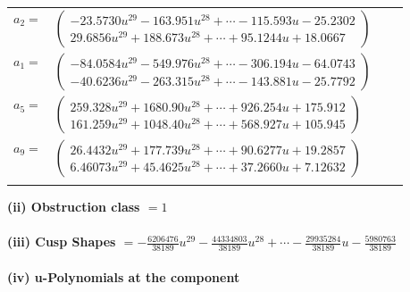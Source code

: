 \documentclass[1p]{elsarticle_modified}
\theoremstyle{definition}
\begin{document}
\begin{tabular}{m{7pt} m{180pt} m{7pt} m{180pt} }
\flushright $a_{2}=$&$\begin{pmatrix}-23.5730 u^{29}-163.951 u^{28}+\cdots-115.593 u-25.2302\\29.6856 u^{29}+188.673 u^{28}+\cdots+95.1244 u+18.0667\end{pmatrix}$ \\
\flushright $a_{1}=$&$\begin{pmatrix}-84.0584 u^{29}-549.976 u^{28}+\cdots-306.194 u-64.0743\\-40.6236 u^{29}-263.315 u^{28}+\cdots-143.881 u-25.7792\end{pmatrix}$ \\
\flushright $a_{5}=$&$\begin{pmatrix}259.328 u^{29}+1680.90 u^{28}+\cdots+926.254 u+175.912\\161.259 u^{29}+1048.40 u^{28}+\cdots+568.927 u+105.945\end{pmatrix}$ \\
\flushright $a_{9}=$&$\begin{pmatrix}26.4432 u^{29}+177.739 u^{28}+\cdots+90.6277 u+19.2857\\6.46073 u^{29}+45.4625 u^{28}+\cdots+37.2660 u+7.12632\end{pmatrix}$\\&\end{tabular}
\flushleft \textbf{(ii) Obstruction class $= 1$}\\~\\
\flushleft \textbf{(iii) Cusp Shapes $= -\frac{6206476}{38189} u^{29}-\frac{44334803}{38189} u^{28}+\cdots-\frac{29935284}{38189} u-\frac{5980763}{38189}$}\\~\\
\newpage\renewcommand{\arraystretch}{1}
\flushleft \textbf{(iv) u-Polynomials at the component}\newline \\
\end{document}
